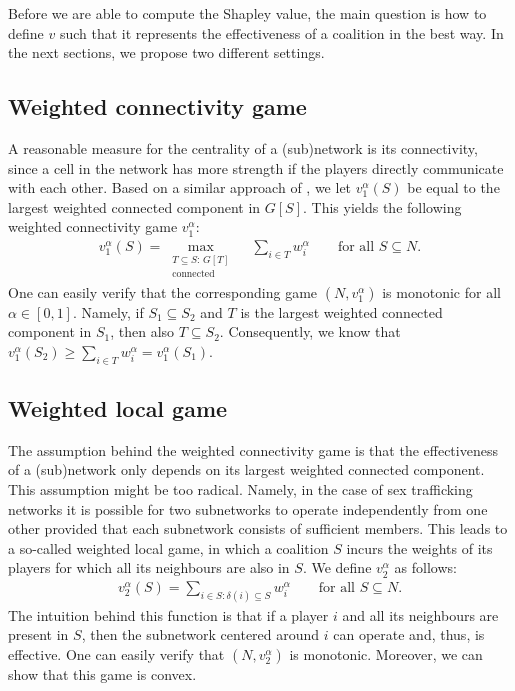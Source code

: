 \documentclass[10p]{article}
\theoremstyle{definition}
\theoremstyle{definition}
\begin{document}
Before we are able to compute the Shapley value, the main question is how to define $v$ such that it represents the effectiveness of a coalition in the best way. In the next sections, we propose two different settings.

\subsection{Weighted connectivity game}
A reasonable measure for the centrality of a (sub)network is its connectivity, since a cell in the network has more strength if the players directly communicate with each other. Based on a similar approach of \cite{husslage2015ranking}, we let $v_1^\alpha(S)$ be equal to the largest weighted connected component in $G[S]$. This yields the following weighted connectivity game $v^\alpha_1$:
\begin{align*}
    v_1^\alpha(S) = \max_{\substack{T \subseteq S : \, G[T] \\ \text{connected}}}\quad \sum_{i \in T}w^\alpha_i \qquad \text{for all $S \subseteq N$.} 
\end{align*}
One can easily verify that the corresponding game $(N, v_1^\alpha)$ is monotonic for all $\alpha \in [0,1]$. Namely, if $S_1 \subseteq S_2$ and $T$ is the largest weighted connected component in $S_1$, then also $T \subseteq S_2$. Consequently, we know that $v_1^\alpha(S_2) \geq \sum_{i \in T}w^\alpha_i = v_1^\alpha(S_1)$.

\subsection{Weighted local game}
The assumption behind the weighted connectivity game is that the effectiveness of a (sub)network only depends on its largest weighted connected component. This assumption might be too radical. Namely, in the case of sex trafficking networks it is possible for two subnetworks to operate independently from one other provided that each subnetwork consists of sufficient members. This leads to a so-called weighted local game, in which a coalition $S$ incurs the weights of its players for which all its neighbours are also in $S$. We define $v_2^\alpha$ as follows:
\begin{align*}
    v_2^\alpha (S) = \sum_{i \in S : \delta(i) \subseteq S} w_i^
    \alpha \qquad \text{for all $S \subseteq N$.}
\end{align*}
The intuition behind this function is that if a player $i$ and all its neighbours are present in $S$, then the subnetwork centered around $i$ can operate and, thus, is effective. One can easily verify that $(N,v_2^\alpha)$ is monotonic. Moreover, we can show that this game is convex.
\end{document}
